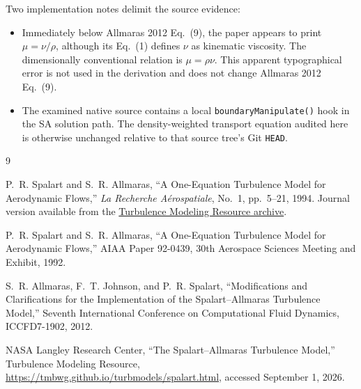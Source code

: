 \documentclass[11pt]{article}
\newcommand{\SAcode}[1]{\texttt{#1}}
\begin{document}
Two implementation notes delimit the source evidence:\par\smallskip
\begin{itemize}
  \item Immediately below Allmaras 2012 Eq.~(9), the paper appears to print
    \(\mu=\nu/\rho\), although its Eq.~(1) defines \(\nu\) as kinematic
    viscosity.  The dimensionally conventional relation is \(\mu=\rho\nu\).
    This apparent typographical error is not used in the derivation and does
    not change Allmaras 2012 Eq.~(9).
  \item The examined native source contains a local
    \SAcode{boundaryManipulate()} hook in the SA solution path.  The
    density-weighted transport equation audited here is otherwise unchanged
    relative to that source tree's Git \SAcode{HEAD}.
\end{itemize}
\endgroup
\clearpage
\begin{thebibliography}{9}
\raggedright

P.~R. Spalart and S.~R. Allmaras,
\textquotedblleft{}A One-Equation Turbulence Model for Aerodynamic Flows,''
\emph{La Recherche A\'erospatiale}, No.~1, pp.~5--21, 1994.
Journal version available from the
\href{https://tmbwg.github.io/turbmodels/Papers/RechAerosp_1994_SpalartAllmaras.pdf}{Turbulence Modeling Resource archive}.

P.~R. Spalart and S.~R. Allmaras,
\textquotedblleft{}A One-Equation Turbulence Model for Aerodynamic Flows,''
AIAA Paper 92-0439, 30th Aerospace Sciences Meeting and Exhibit, 1992.

S.~R. Allmaras, F.~T. Johnson, and P.~R. Spalart,
\textquotedblleft{}Modifications and Clarifications for the Implementation of the
Spalart--Allmaras Turbulence Model,''
Seventh International Conference on Computational Fluid Dynamics,
ICCFD7-1902, 2012.

NASA Langley Research Center,
\textquotedblleft{}The Spalart--Allmaras Turbulence Model,''
Turbulence Modeling Resource,
\url{https://tmbwg.github.io/turbmodels/spalart.html},
accessed September 1, 2026.

\end{thebibliography}
\end{document}
